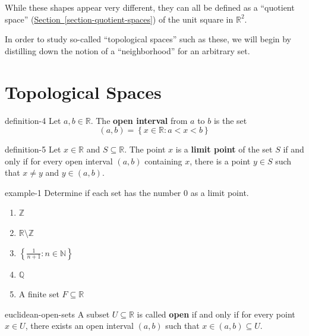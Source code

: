 \documentclass[10pt,]{article}
\newcommand{\terminology}[1]{\textbf{#1}}
\newcommand{\mb}{\mathbb}
\newcommand{\setBuilder}[2]{\left\{#1:#2\right\}}
\newcommand{\lt}{<}
\begin{document}
\hypertarget{p-18}{}%
While these shapes appear very different, they can all be defined as a ``quotient space'' (\hyperref[section-quotient-spaces]{Section~\ref{section-quotient-spaces}}) of the unit square in \(\mathbb R^2\).%
\par
\hypertarget{p-19}{}%
In order to study so-called ``topological spaces'' such as these, we will begin by distilling down the notion of a ``neighborhood'' for an arbitrary set.%
%
%
\typeout{************************************************}
\typeout{************************************************}
%
\section[{Topological Spaces}]{Topological Spaces}\label{section-topological-spaces}
\begin{definition}{}{definition-4}%
\hypertarget{p-20}{}%
Let \(a,b\in\mb R\). The \terminology{open interval} from \(a\) to \(b\) is the set%
%
\begin{equation*}
(a,b)=\setBuilder{x\in\mb R}{a\lt x\lt b}
\end{equation*}
\end{definition}
\begin{definition}{}{definition-5}%
\hypertarget{p-21}{}%
Let \(x\in\mb R\) and \(S\subseteq\mb R\). The point \(x\) is a \terminology{limit point} of the set \(S\) if and only if for every open interval \((a,b)\) containing \(x\), there is a point \(y\in S\) such that \(x\not=y\) and \(y\in(a,b)\).%
\end{definition}
\begin{example}{}{example-1}%
\hypertarget{p-22}{}%
Determine if each set has the number \(0\) as a limit point.%
\leavevmode%
\begin{enumerate}
\item\hypertarget{li-3}{}\(\mb Z\)%
\item\hypertarget{li-4}{}\(\mb R\setminus\mb Z\)%
\item\hypertarget{li-5}{}\(\setBuilder{\frac{1}{n+1}}{n\in\mb N}\)%
\item\hypertarget{li-6}{}\(\mb Q\)%
\item\hypertarget{li-7}{}A finite set \(F\subseteq\mb R\)%
\end{enumerate}
\end{example}
\begin{definition}{}{euclidean-open-sets}%
\hypertarget{p-23}{}%
A subset \(U\subseteq\mb R\) is called \terminology{open} if and only if for every point \(x\in U\), there exists an open interval \((a,b)\) such that \(x\in(a,b)\subseteq U\).%
\end{definition}
\end{document}
